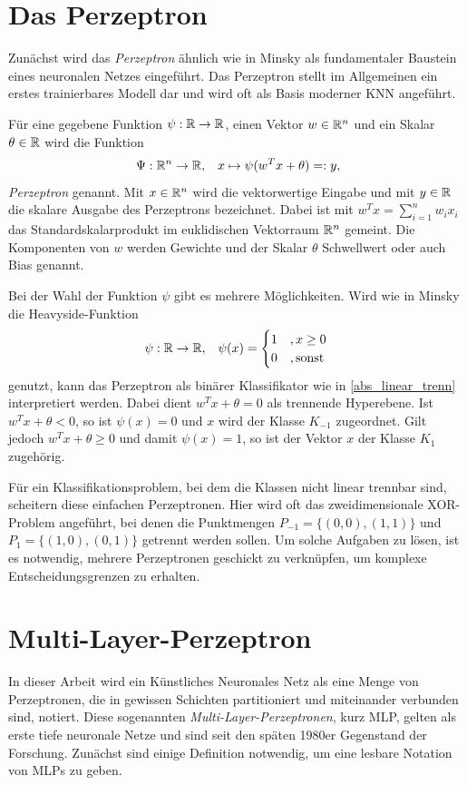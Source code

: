 \section{Das Perzeptron}
\label{perzeptron_abs}
Zunächst wird das \textit{Perzeptron} ähnlich wie in Minsky \cite{minsky2017perceptrons} als fundamentaler Baustein eines neuronalen Netzes eingeführt. Das Perzeptron stellt im Allgemeinen ein erstes trainierbares Modell dar und wird oft als Basis moderner KNN angeführt. 
\begin{defi}[Perzeptron]
    \label{def_neuron}
    Für eine gegebene Funktion $\psi: \mathbb{R} \rightarrow \mathbb{R}$, einen Vektor $w \in \mathbb{R}^{n}$ und ein Skalar $\theta \in \mathbb{R}$ wird die Funktion 
    \[ \
    \Psi: \mathbb{R}^n \rightarrow \mathbb{R}, \; \; \; x \mapsto \psi(w^T x +\theta)=:y,
    \]
    \textit{Perzeptron} genannt. Mit $x \in \mathbb{R}^{n}$ wird die vektorwertige Eingabe und mit $y \in \mathbb{R}$ die skalare Ausgabe des Perzeptrons bezeichnet. Dabei ist mit $w^Tx=\sum_{i=1}^n w_i x_i$ das Standardskalarprodukt im euklidischen Vektorraum $\mathbb{R}^{n}$ gemeint. Die Komponenten von $w$ werden Gewichte und der Skalar $\theta$ Schwellwert oder auch Bias genannt.
\end{defi}
Bei der Wahl der Funktion $\psi$ gibt es mehrere Möglichkeiten. Wird wie in Minsky\cite{minsky2017perceptrons} die Heavyside-Funktion
\begin{equation*}
    \psi: \mathbb{R} \rightarrow \mathbb{R}, \; \; \;
    \psi(x)=\begin{cases}
       1 &, x \geq 0 \\
       0 &, \text{sonst}
    \end{cases}
\end{equation*} 
genutzt, kann das Perzeptron als binärer Klassifikator wie in \ref{abs_linear_trenn} interpretiert werden. Dabei dient $w^Tx+\theta=0$ als trennende Hyperebene. Ist $w^Tx+\theta<0$, so ist $\psi(x)=0$ und $x$ wird der Klasse $K_{-1}$ zugeordnet. Gilt jedoch $w^Tx+\theta \geq 0$ und damit $\psi(x)=1$, so ist der Vektor $x$ der Klasse $K_1$ zugehörig. 

Für ein Klassifikationsproblem, bei dem die Klassen nicht linear trennbar sind, scheitern diese einfachen Perzeptronen. Hier wird oft das zweidimensionale XOR-Problem angeführt, bei denen die Punktmengen $P_{-1}=\{(0,0),(1,1)\}$ und $P_{1}=\{(1,0),(0,1)\}$ getrennt werden sollen. Um solche Aufgaben zu lösen, ist es notwendig, mehrere Perzeptronen geschickt zu verknüpfen, um komplexe Entscheidungsgrenzen zu erhalten.

\section{Multi-Layer-Perzeptron}
In dieser Arbeit wird ein Künstliches Neuronales Netz als eine Menge von Perzeptronen, die in gewissen Schichten partitioniert und miteinander verbunden sind, notiert. Diese sogenannten \textit{Multi-Layer-Perzeptronen}, kurz MLP,  gelten als erste tiefe neuronale Netze und sind seit den späten 1980er Gegenstand der Forschung\cite{bourlard1990links,bounds1988multilayer,MLPbook}. Zunächst sind einige Definition notwendig, um eine lesbare Notation von MLPs zu geben.

